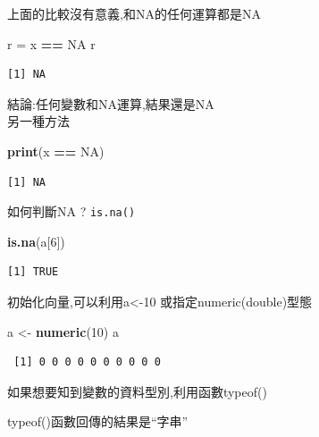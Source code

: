 \documentclass[]{book}
\newenvironment{Shaded}{\begin{snugshade}}{\end{snugshade}}
\newcommand{\DecValTok}[1]{\textcolor[rgb]{0.00,0.00,0.81}{#1}}
\newcommand{\KeywordTok}[1]{\textcolor[rgb]{0.13,0.29,0.53}{\textbf{#1}}}
\newcommand{\NormalTok}[1]{#1}
\newcommand{\OperatorTok}[1]{\textcolor[rgb]{0.81,0.36,0.00}{\textbf{#1}}}
\newcommand{\OtherTok}[1]{\textcolor[rgb]{0.56,0.35,0.01}{#1}}
\newcommand{\StringTok}[1]{\textcolor[rgb]{0.31,0.60,0.02}{#1}}
\theoremstyle{definition}
\theoremstyle{definition}
\theoremstyle{definition}
\theoremstyle{remark}
\begin{document}
上面的比較沒有意義,和NA的任何運算都是NA

\begin{Shaded}
\begin{Highlighting}[]
\NormalTok{r =}\StringTok{ }\NormalTok{x }\OperatorTok{==}\StringTok{ }\OtherTok{NA}
\NormalTok{r}
\end{Highlighting}
\end{Shaded}

\begin{verbatim}
[1] NA
\end{verbatim}

結論:任何變數和NA運算,結果還是NA\\
另一種方法

\begin{Shaded}
\begin{Highlighting}[]
\KeywordTok{print}\NormalTok{(x }\OperatorTok{==}\StringTok{ }\OtherTok{NA}\NormalTok{)}
\end{Highlighting}
\end{Shaded}

\begin{verbatim}
[1] NA
\end{verbatim}

如何判斷NA ? \texttt{is.na()}

\begin{Shaded}
\begin{Highlighting}[]
    \KeywordTok{is.na}\NormalTok{(a[}\DecValTok{6}\NormalTok{])}
\end{Highlighting}
\end{Shaded}

\begin{verbatim}
[1] TRUE
\end{verbatim}

初始化向量,可以利用a\textless{}-10 或指定numeric(double)型態

\begin{Shaded}
\begin{Highlighting}[]
\NormalTok{a <-}\StringTok{ }\KeywordTok{numeric}\NormalTok{(}\DecValTok{10}\NormalTok{) }
\NormalTok{a}
\end{Highlighting}
\end{Shaded}

\begin{verbatim}
 [1] 0 0 0 0 0 0 0 0 0 0
\end{verbatim}

如果想要知到變數的資料型別,利用函數typeof()

typeof()函數回傳的結果是``字串''
\end{document}
